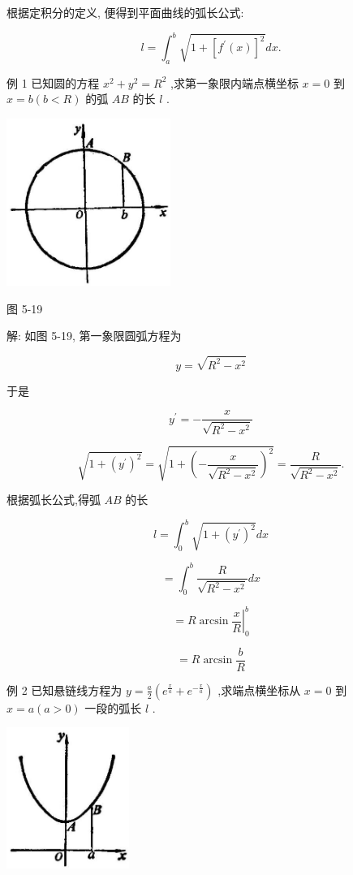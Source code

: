 \documentclass[10pt]{article}
\begin{document}
根据定积分的定义, 便得到平面曲线的弧长公式:

\[
l = {\int }_{a}^{b}\sqrt{1 + {\left\lbrack {f}^{\prime }\left( x\right) \right\rbrack }^{2}}{dx}.
\]

例 1 已知圆的方程 \({x}^{2} + {y}^{2} = {R}^{2}\) ,求第一象限内端点横坐标 \(x = 0\) 到 \(x = b\left( {b < R}\right)\) 的弧 \({AB}\) 的长 \(l\) .

\begin{center}
\includegraphics[max width=0.4\textwidth]{images/01912c18-5c3f-733d-b775-749ba9897a9d_242_691071.jpg}
\end{center}

图 5-19

解: 如图 5-19, 第一象限圆弧方程为

\[
y = \sqrt{{R}^{2} - {x}^{2}}
\]

于是

\[
{y}^{\prime } = - \frac{x}{\sqrt{{R}^{2} - {x}^{2}}}
\]

\[
\sqrt{1 + {\left( {y}^{\prime }\right) }^{2}} = \sqrt{1 + {\left( -\frac{x}{\sqrt{{R}^{2} - {x}^{2}}}\right) }^{2}} = \frac{R}{\sqrt{{R}^{2} - {x}^{2}}}.
\]

根据弧长公式,得弧 \({AB}\) 的长

\[
l = {\int }_{0}^{b}\sqrt{1 + {\left( {y}^{\prime }\right) }^{2}}{dx}
\]

\[
= {\int }_{0}^{b}\frac{R}{\sqrt{{R}^{2} - {x}^{2}}}{dx}
\]

\[
= {\left. R\arcsin \frac{x}{R}\right| }_{0}^{b}
\]

\[
= R\arcsin \frac{b}{R}
\]

例 2 已知悬链线方程为 \(y = \frac{a}{2}\left( {{e}^{\frac{x}{a}} + {e}^{-\frac{x}{a}}}\right)\) ,求端点横坐标从 \(x = 0\) 到 \(x = a\left( {a > 0}\right)\) 一段的弧长 \(l\) .

\begin{center}
\includegraphics[max width=0.3\textwidth]{images/01912c18-5c3f-733d-b775-749ba9897a9d_243_219487.jpg}
\end{center}
\end{document}
